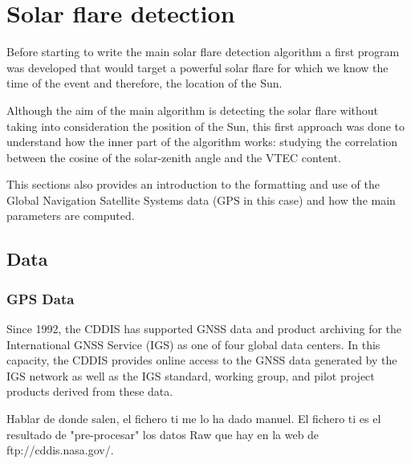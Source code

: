 \chapter{Solar flare detection}

Before starting to write the main solar flare detection algorithm a first program was developed that would target a powerful solar flare for which we know the time of the event and therefore, the location of the Sun.

Although the aim of the main algorithm is detecting the solar flare without taking into consideration the position of the Sun, this first approach was done to understand how the inner part of the algorithm works: studying the correlation between the cosine of the solar-zenith angle and the VTEC content.

This sections also provides an introduction to the formatting and use of the Global Navigation Satellite Systems data (GPS in this case) and how the main parameters are computed.

\section{Data}

\subsection{GPS Data}

Since 1992, the CDDIS has supported GNSS data and product archiving for the International GNSS Service (IGS) as one of four global data centers. In this capacity, the CDDIS provides online access to the GNSS data generated by the IGS network as well as the IGS standard, working group, and pilot project products derived from these data.

Hablar de donde salen, el fichero ti me lo ha dado manuel. El fichero ti es el resultado de "pre-procesar" los datos Raw que hay en la web de ftp://cddis.nasa.gov/.















